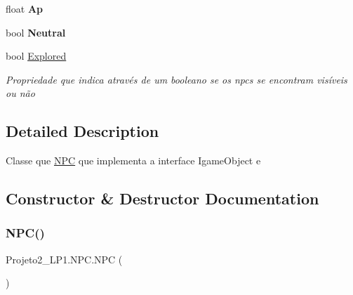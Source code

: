 \begin{DoxyCompactItemize}
\mbox{\label{class_projeto2___l_p1_1_1_n_p_c_a21965f8f0967199ce8120a04bc325dfe}} 
float {\bfseries Ap}
\item 
\mbox{\label{class_projeto2___l_p1_1_1_n_p_c_ad3440d4bc88d9ad21dc231dd92f07aab}} 
bool {\bfseries Neutral}
\item 
bool \mbox{\hyperlink{class_projeto2___l_p1_1_1_n_p_c_a9838a4789d8c2e2e57f31a894ac81771}{Explored}}
\begin{DoxyCompactList}\small\item\em Propriedade que indica através de um booleano se os npcs se encontram visíveis ou não \end{DoxyCompactList}\end{DoxyCompactItemize}


\subsection{Detailed Description}
Classe que \mbox{\hyperlink{class_projeto2___l_p1_1_1_n_p_c}{N\+PC}} que implementa a interface Igame\+Object e 



\subsection{Constructor \& Destructor Documentation}
\mbox{\label{class_projeto2___l_p1_1_1_n_p_c_a043637b5314dd4174b26a30f2af54584}} 
\subsubsection{\texorpdfstring{N\+P\+C()}{NPC()}}
{\footnotesize\ttfamily Projeto2\+\_\+\+L\+P1.\+N\+P\+C.\+N\+PC (\begin{DoxyParamCaption}{ }\end{DoxyParamCaption})\hspace{0.3cm}{\ttfamily [inline]}}

